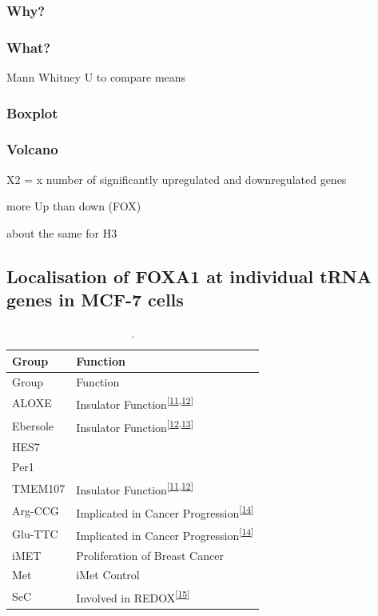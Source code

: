 \documentclass[
  12pt,
]{article}
\begin{document}
\hypertarget{why}{%
\subsubsection{Why?}\label{why}}

\hypertarget{what}{%
\subsubsection{What?}\label{what}}

Mann Whitney U to compare means

\hypertarget{boxplot}{%
\subsubsection{Boxplot}\label{boxplot}}

\hypertarget{volcano}{%
\subsubsection{Volcano}\label{volcano}}

X2 = x number of significantly upregulated and downregulated genes

more Up than down (FOX)

about the same for H3

\hypertarget{localisation-of-foxa1-at-individual-trna-genes-in-mcf-7-cells}{%
\subsection{Localisation of FOXA1 at individual tRNA genes in MCF-7 cells}\label{localisation-of-foxa1-at-individual-trna-genes-in-mcf-7-cells}}

\begin{longtable}[]{@{}ll@{}}
\caption{\label{tab:clusters}.}\tabularnewline
\toprule()
Group & Function \\
\midrule()
\endfirsthead
\toprule()
Group & Function \\
\midrule()
\endhead
ALOXE & Insulator Function\textsuperscript{{[}\protect\hyperlink{ref-raab2011}{11},\protect\hyperlink{ref-sizer2022}{12}{]}} \\
Ebersole & Insulator Function\textsuperscript{{[}\protect\hyperlink{ref-sizer2022}{12},\protect\hyperlink{ref-Ebersole2011}{13}{]}} \\
HES7 & \\
Per1 & \\
TMEM107 & Insulator Function\textsuperscript{{[}\protect\hyperlink{ref-raab2011}{11},\protect\hyperlink{ref-sizer2022}{12}{]}} \\
Arg-CCG & Implicated in Cancer Progression\textsuperscript{{[}\protect\hyperlink{ref-Goodarzi2016}{14}{]}} \\
Glu-TTC & Implicated in Cancer Progression\textsuperscript{{[}\protect\hyperlink{ref-Goodarzi2016}{14}{]}} \\
iMET & Proliferation of Breast Cancer \\
Met & iMet Control \\
SeC & Involved in REDOX\textsuperscript{{[}\protect\hyperlink{ref-Sangha2022}{15}{]}} \\
\bottomrule()
\end{longtable}
\end{document}
